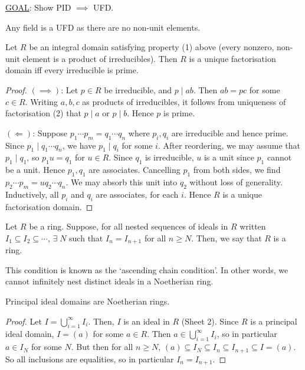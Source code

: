 \underline{GOAL}: Show PID $\implies$ UFD.

\begin{remark}
	Any field is a UFD as there are no non-unit elements.
\end{remark}

\begin{proposition} \label{prp:10.6}
	Let $R$ be an integral domain satisfying property (1) above (every nonzero, non-unit element is a product of irreducibles).
	Then $R$ is a unique factorisation domain iff every irreducible is prime.
\end{proposition}

\begin{proof}
	$(\implies)$: Let $p \in R$ be irreducible, and $p \mid ab$.
	Then $ab = pc$ for some $c \in R$.
	Writing $a, b, c$ as products of irreducibles, it follows from uniqueness of factorisation (2) that $p \mid a$ or $p \mid b$.
	Hence $p$ is prime.

	$(\Longleftarrow)$: Suppose $p_1 \cdots p_m = q_1 \cdots q_n$ where $p_i, q_i$ are irreducible and hence prime.
	Since $p_1 \mid q_1 \cdots q_n$, we have $p_1 \mid q_i$ for some $i$.
	After reordering, we may assume that $p_1 \mid q_1$, so $p_1 u = q_1$ for $u \in R$.
	Since $q_1$ is irreducible, $u$ is a unit since $p_1$ cannot be a unit.
	Hence $p_1, q_1$ are associates.
	Cancelling $p_1$ from both sides, we find $p_2 \cdots p_m = u q_2 \cdots q_n$.
	We may absorb this unit into $q_2$ without loss of generality.
	Inductively, all $p_i$ and $q_i$ are associates, for each $i$.
	Hence $R$ is a unique factorisation domain.
\end{proof}

\begin{definition}[Noetherian]
	Let $R$ be a ring.
	Suppose, for all nested sequences of ideals in $R$ written $I_1 \subseteq I_2 \subseteq \cdots$, $\exists \; N$ such that $I_n = I_{n+1}$ for all $n \geq N$.
	Then, we say that $R$ is a  ring.
\end{definition}

This condition is known as the `ascending chain condition'.
In other words, we cannot infinitely nest distinct ideals in a Noetherian ring.

\begin{lemma} \label{lem:10.7}
	Principal ideal domains are Noetherian rings.
\end{lemma}

\begin{proof}
	Let $I = \bigcup_{i=1}^\infty I_i$.
	Then, $I$ is an ideal in $R$ (Sheet 2).
	Since $R$ is a principal ideal domain, $I = (a)$ for some $a \in R$.
	Then $a \in \bigcup_{i=1}^\infty I_i$, so in particular $a \in I_N$ for some $N$.
	But then for all $n \geq N$, $(a) \subseteq I_N \subseteq I_{n} \subseteq I_{n+1} \subseteq I = (a)$.
	So all inclusions are equalities, so in particular $I_n = I_{n+1}$.
\end{proof}

